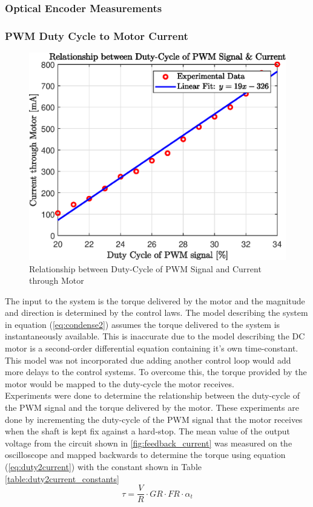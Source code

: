 \subsubsection{Optical Encoder Measurements}

\subsubsection{ PWM Duty Cycle to Motor Current}

\begin{figure}[h]
	\centering
	\includegraphics[scale=1]{./figs/dutycycle_vs_current.eps}
	\caption{Relationship between Duty-Cycle of PWM Signal and Current through Motor}
	\label{fig:dutycycle_vs_current}
\end{figure}

The input to the system is the torque delivered by the motor and the magnitude and direction is determined by the control laws. The model describing the system in equation (\ref{eq:condense2}) assumes the torque delivered to the system is instantaneously available. This is inaccurate due to the model describing the DC motor is a second-order differential equation containing it's own time-constant. This model was not incorporated due adding another control loop would add more delays to the control systems. To overcome this, the torque provided by the motor would be mapped to the duty-cycle the motor receives.\\

Experiments were done to determine the relationship between the duty-cycle of the PWM signal and the torque delivered by the motor. These experiments are done by incrementing the duty-cycle of the PWM signal that the motor receives when the shaft is kept fix against a hard-stop. The mean value of the output voltage from the circuit shown in \ref{fig:feedback_current} was measured on the oscilloscope and mapped backwards to determine the torque using equation (\ref{eq:duty2current}) with the constant shown in Table \ref{table:duty2current_constants}
\begin{equation} \label{eq:duty2current}
\tau = \frac{V}{R}\cdot GR \cdot FR \cdot \alpha_{t}
\end{equation}

